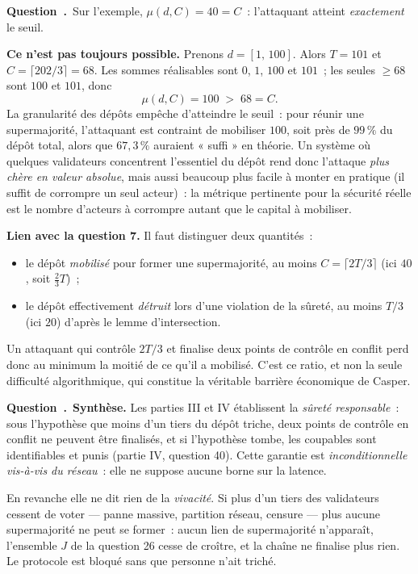 \documentclass[11pt,a4paper]{article}
\renewcommand{\Q}{\medskip\par\stepcounter{qcnt}\noindent\textbf{\color{cnc}Question~\theqcnt.}~}
\begin{document}
\Q Sur l'exemple, $\mu(d,C)=40=C$~: l'attaquant atteint \emph{exactement} le seuil.

\textbf{Ce n'est pas toujours possible.} Prenons $d=[1,\,100]$. Alors $T=101$ et
$C=\lceil 202/3\rceil = 68$. Les sommes réalisables sont $0$, $1$, $100$ et $101$~; les
seules $\ge 68$ sont $100$ et $101$, donc
\[ \mu(d,C) = 100 \;>\; 68 = C. \]
La granularité des dépôts empêche d'atteindre le seuil~: pour réunir une supermajorité,
l'attaquant est contraint de mobiliser $100$, soit près de $99\,\%$ du dépôt total, alors que
$67{,}3\,\%$ auraient « suffi » en théorie. Un système où quelques validateurs concentrent
l'essentiel du dépôt rend donc l'attaque \emph{plus chère en valeur absolue}, mais aussi
beaucoup plus facile à monter en pratique (il suffit de corrompre un seul acteur)~: la
métrique pertinente pour la sécurité réelle est le nombre d'acteurs à corrompre autant que le
capital à mobiliser.

\textbf{Lien avec la question 7.} Il faut distinguer deux quantités~:
\begin{itemize}[leftmargin=1.4em,itemsep=1pt]
\item le dépôt \emph{mobilisé} pour former une supermajorité, au moins
$C=\lceil 2T/3\rceil$ (ici $40$, soit $\tfrac23 T$)~;
\item le dépôt effectivement \emph{détruit} lors d'une violation de la sûreté, au moins
$T/3$ (ici $20$) d'après le lemme d'intersection.
\end{itemize}
Un attaquant qui contrôle $2T/3$ et finalise deux points de contrôle en conflit perd donc au
minimum la moitié de ce qu'il a mobilisé. C'est ce ratio, et non la seule difficulté
algorithmique, qui constitue la véritable barrière économique de Casper.

\Q \textbf{Synthèse.} Les parties III et IV établissent la \emph{sûreté responsable}~: sous
l'hypothèse que moins d'un tiers du dépôt triche, deux points de contrôle en conflit ne
peuvent être finalisés, et si l'hypothèse tombe, les coupables sont identifiables et punis
(partie IV, question 40). Cette garantie est \emph{inconditionnelle vis-à-vis du réseau}~:
elle ne suppose aucune borne sur la latence.

En revanche elle ne dit rien de la \emph{vivacité}. Si plus d'un tiers des validateurs
cessent de voter — panne massive, partition réseau, censure — plus aucune supermajorité ne
peut se former~: aucun lien de supermajorité n'apparaît, l'ensemble $J$ de la question 26
cesse de croître, et la chaîne ne finalise plus rien. Le protocole est bloqué sans que
personne n'ait triché.
\end{document}
